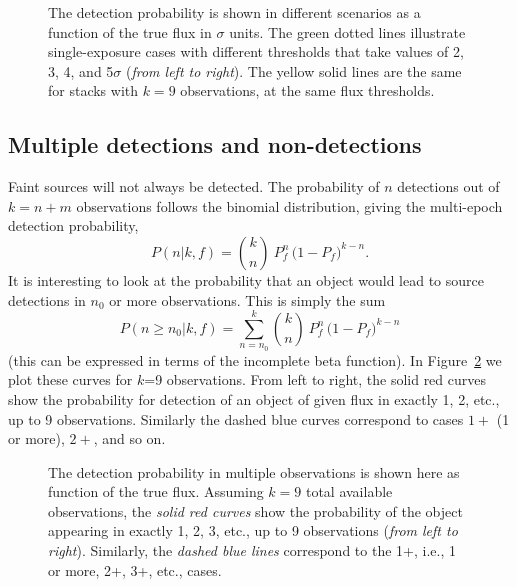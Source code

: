 \documentclass[twocolumn]{emulateapj}
\begin{document}
\begin{figure}
\caption{The detection probability is shown in different scenarios as a function of the true flux in $\sigma$ units. The green dotted lines illustrate single-exposure cases with different thresholds that take values of 2, 3, 4, and 5$\sigma$ ({\it{}from left to right}). The yellow solid lines are the same for stacks with \mbox{$k\!=\!9$} observations, at the same flux thresholds.}
\label{fig:1}
\end{figure}


\subsection{Multiple detections and non-detections}
\noindent
%
Faint sources will not always be detected.
%
The probability of $n$ detections out of \mbox{$k=n+m$} observations follows the binomial distribution, giving the multi-epoch detection probability,
%
\begin{equation} \label{eq:binomial}
 P(n|k,f) = {k \choose n}\ P_f^n\,\big(1\!-\!P_f\big)^{k-n}.
\end{equation}
%
It is interesting to look at the probability that an object would lead to source detections in $n_0$ or more observations.
This is simply the sum
\begin{equation}
P(n\!\geq{}\!n_0|k,f) = \sum_{n=n_0}^k {k \choose n}\ P_f^n\,\big(1\!-\!P_f\big)^{k-n}
\end{equation}
%
(this can be expressed in terms of the incomplete beta function).
In Figure~\ref{fig:2} we plot these curves for \mbox{$k$=9} observations.
From left to right, the solid red curves show the probability for detection of an object of given flux in exactly 1, 2, etc., up to 9 observations.
Similarly the dashed blue curves correspond to cases $1+$ (1 or more), $2+$, and so on.

\begin{figure}
\caption{The detection probability in multiple observations is shown here as function of the true flux. Assuming \mbox{$k\!=\!9$} total available observations, the {\it{}solid red curves} show the probability of the object appearing in exactly 1, 2, 3, etc., up to 9 observations ({\it{}from left to right}). Similarly, the {\it{}dashed blue lines} correspond to the 1+, i.e., 1 or more, 2+, 3+, etc., cases.}
\label{fig:2}
\end{figure}
\end{document}
